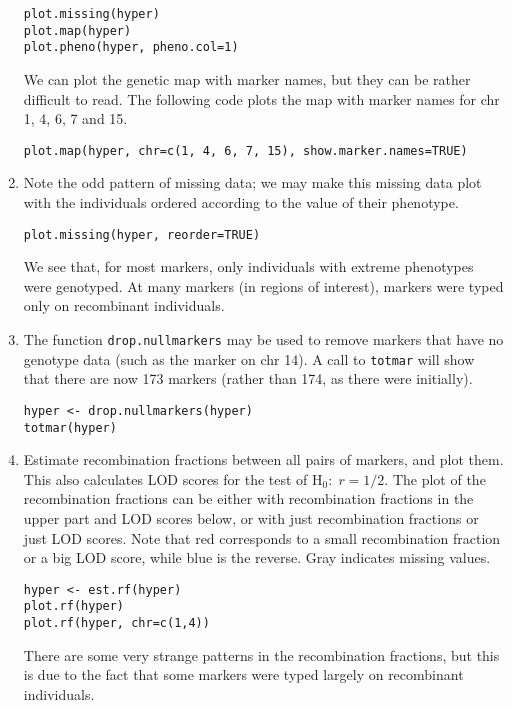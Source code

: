 \documentclass[10pt,letterpaper]{article}
\newcommand{\usercolor}{\color [named]{BlueViolet}}
\begin{document}
\begin{enumerate}
\usercolor 
\verb|plot.missing(hyper)| \\
\verb|plot.map(hyper)| \\
\verb|plot.pheno(hyper, pheno.col=1)| %
\normalcolor

We can plot the genetic map with marker names, but they can be rather
difficult to read.  The following code plots the map with marker names
for chr 1, 4, 6, 7 and 15.

\usercolor
\verb|plot.map(hyper, chr=c(1, 4, 6, 7, 15), show.marker.names=TRUE)|
\normalcolor

\item Note the odd pattern of missing data; we may make this missing
data plot with the individuals ordered according to the value of their
phenotype.

\usercolor 
\verb|plot.missing(hyper, reorder=TRUE)| 
\normalcolor

We see that, for most markers, only individuals with extreme
phenotypes were genotyped.  At many markers (in regions of interest),
markers were typed only on recombinant individuals.

\item The function \verb-drop.nullmarkers- may be used to remove
markers that have no genotype data (such as the marker on chr
14).  A call to \verb-totmar- will show that there are now 173 markers
(rather than 174, as there were initially).  

\usercolor
\verb|hyper <- drop.nullmarkers(hyper)| \\
\verb|totmar(hyper)| \normalcolor

\item Estimate recombination fractions between all pairs of markers,
and plot them. This also calculates LOD scores for the test of
H$_0{:} \; r=1/2$.  The plot of the recombination fractions can be
either with recombination fractions in the upper part and LOD scores
below, or with just recombination fractions or just LOD scores.  Note
that red corresponds to a small recombination fraction or a big LOD
score, while blue is the reverse.  Gray indicates missing values.

\usercolor \verb|hyper <- est.rf(hyper)| \\
\verb|plot.rf(hyper)| \\
\verb|plot.rf(hyper, chr=c(1,4))| \normalcolor

There are some very strange patterns in the recombination fractions,
but this is due to the fact that some markers were typed largely on
recombinant individuals.


\end{enumerate}
\end{document}

